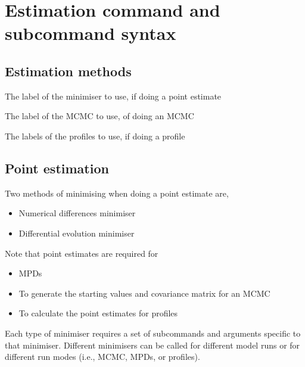 \section{Estimation command and subcommand syntax\label{sec:estimation-syntax}}

\subsection{Estimation methods}


 {The label of the minimiser to use, if doing a point estimate}

 {The label of the MCMC to use, of doing an MCMC}

 {The labels of the profiles to use, if doing a profile}


\subsection{Point estimation}

Two methods of minimising when doing a point estimate are,

\begin{itemize}
	\item Numerical differences minimiser
  \item Differential evolution minimiser
\end{itemize}

Note that point estimates are required for

\begin{itemize}
  \item MPDs
  \item To generate the starting values and covariance matrix for an MCMC
  \item To calculate the point estimates for profiles
\end{itemize}

Each type of minimiser requires a set of subcommands and arguments specific to that minimiser. Different minimisers can be called for different model runs or for different run modes (i.e., MCMC, MPDs, or profiles).

